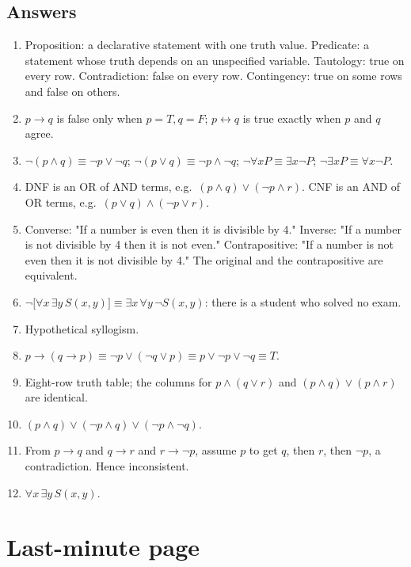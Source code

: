 \documentclass[11pt,a4paper]{article}
\begin{document}
\subsection*{Answers}
\begin{enumerate}
\item Proposition: a declarative statement with one truth value. Predicate: a statement whose truth depends on an unspecified variable. Tautology: true on every row. Contradiction: false on every row. Contingency: true on some rows and false on others.
\item $p\to q$ is false only when $p=T,q=F$; $p\leftrightarrow q$ is true exactly when $p$ and $q$ agree.
\item $\neg(p\land q)\equiv\neg p\lor\neg q$; $\neg(p\lor q)\equiv\neg p\land\neg q$; $\neg\forall xP\equiv\exists x\neg P$; $\neg\exists xP\equiv\forall x\neg P$.
\item DNF is an OR of AND terms, e.g.\ $(p\land q)\lor(\neg p\land r)$. CNF is an AND of OR terms, e.g.\ $(p\lor q)\land(\neg p\lor r)$.
\item Converse: "If a number is even then it is divisible by 4." Inverse: "If a number is not divisible by 4 then it is not even." Contrapositive: "If a number is not even then it is not divisible by 4." The original and the contrapositive are equivalent.
\item $\neg\bigl[\forall x\,\exists y\,S(x,y)\bigr]\equiv\exists x\,\forall y\,\neg S(x,y)$: there is a student who solved no exam.
\item Hypothetical syllogism.
\item $p\to(q\to p)\equiv\neg p\lor(\neg q\lor p)\equiv p\lor\neg p\lor\neg q\equiv T$.
\item Eight-row truth table; the columns for $p\land(q\lor r)$ and $(p\land q)\lor(p\land r)$ are identical.
\item $(p\land q)\lor(\neg p\land q)\lor(\neg p\land\neg q)$.
\item From $p\to q$ and $q\to r$ and $r\to\neg p$, assume $p$ to get $q$, then $r$, then $\neg p$, a contradiction. Hence inconsistent.
\item $\forall x\,\exists y\,S(x,y)$.
\end{enumerate}

\section{Last-minute page}
\end{document}
